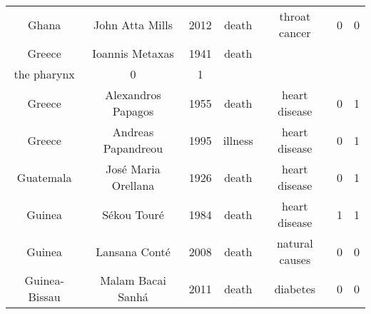 \begin{center}
\begin{longtable}{ccccccc}
Ghana                                                                      & John Atta Mills                                                                       & 2012       & death         & throat cancer                                                          & 0        & 0       \\
Greece                                                                     & Ioannis Metaxas                                                                       & 1941       & death         & \begin{tabular}[c]{@{}c@{}}phlegmon of\\ the pharynx\end{tabular}      & 0        & 1       \\
Greece                                                                     & Alexandros Papagos                                                                    & 1955       & death         & heart disease                                                          & 0        & 1       \\
Greece                                                                     & Andreas Papandreou                                                                    & 1995       & illness       & heart disease                                                          & 0        & 1       \\
Guatemala                                                                  & José Maria Orellana                                                                   & 1926       & death         & heart disease                                                          & 0        & 1       \\
Guinea                                                                     & Sékou Touré                                                                           & 1984       & death         & heart disease                                                          & 1        & 1       \\
Guinea                                                                     & Lansana Conté                                                                         & 2008       & death         & natural causes                                                         & 0        & 0       \\
Guinea-Bissau                                                              & Malam Bacai Sanhá                                                                     & 2011       & death         & diabetes                                                               & 0        & 0       \\

\end{longtable}
\end{center}
